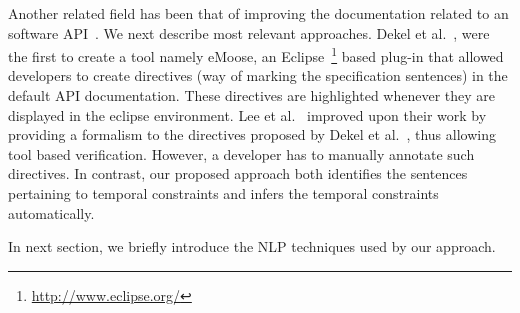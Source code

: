 Another related field has been that of improving the documentation related to an software API~\cite{Dekel2009,tan2011acomment}. We next describe most relevant approaches. Dekel et al.~\cite{Dekel2009}, were the first to create a tool namely eMoose, an Eclipse~\footnote{\url{http://www.eclipse.org/}} based plug-in that allowed developers to create directives (way of marking the specification sentences) in the default API documentation. These directives are highlighted whenever they are displayed in the eclipse environment. Lee et al.~\cite{lee2012towards} improved upon their work by providing a formalism to the directives proposed by Dekel et al.~\cite{Dekel2009}, thus allowing tool based verification. However, a developer has to manually annotate such directives. In contrast, our proposed approach both identifies the sentences pertaining to temporal constraints and infers the temporal constraints automatically. 

In next section, we briefly introduce the NLP techniques used by our approach.




